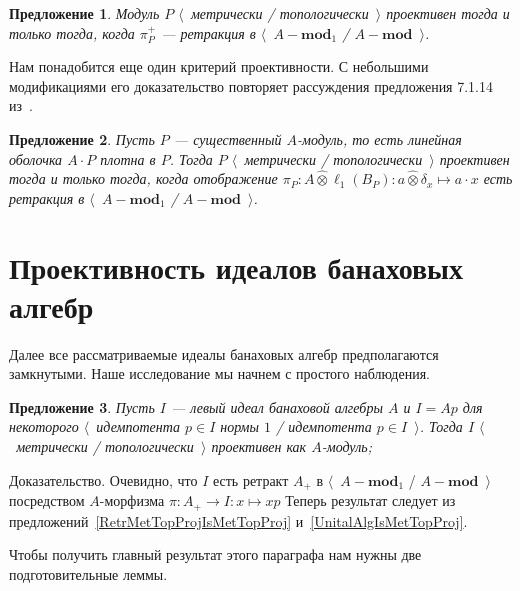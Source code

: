 \documentclass[12pt]{article}
\numberwithin{equation}{subsection}
\theoremstyle{plain}
\newtheorem{proposition}{Предложение}
\newenvironment{proof}{Доказательство.}{}
\newcommand{\projtens}{\mathbin{\widehat{\otimes}}}
\begin{document}
\begin{fulltext}
\begin{proposition}\label{MetTopProjModViaCanonicMorph} Модуль $P$
$\langle$~метрически / топологически~$\rangle$ проективен тогда и только тогда,
когда  $\pi_P^+$ --- ретракция в $\langle$~$A-\mathbf{mod}_1$ /
$A-\mathbf{mod}$~$\rangle$.
\end{proposition}

Нам понадобится еще один критерий проективности. С небольшими модификациями его
доказательство повторяет рассуждения предложения 7.1.14 
из~\cite{HelBanLocConvAlg}.

\begin{proposition}\label{NonDegenMetTopProjCharac} Пусть $P$ --- существенный
$A$-модуль, то есть линейная оболочка $A\cdot P$ плотна в $P$. Тогда $P$
$\langle$~метрически / топологически~$\rangle$ проективен тогда и только тогда,
когда отображение $\pi_P:A\projtens\ell_1(B_P):a\projtens\delta_x\mapsto a\cdot
x$ есть ретракция в $\langle$~$A-\mathbf{mod}_1$ / $A-\mathbf{mod}$~$\rangle$.
\end{proposition} 

\section{Проективность идеалов банаховых алгебр}\label{
    MetricAndTopologicalProjectivityOfIdeals
}

Далее все рассматриваемые идеалы банаховых алгебр предполагаются замкнутыми.
Наше исследование мы начнем с простого наблюдения.

\begin{proposition}\label{UnIdeallIsMetTopProj} Пусть $I$ --- левый идеал
банаховой алгебры $A$ и $I=Ap$ для некоторого $\langle$~идемпотента $p\in I$
нормы $1$ / идемпотента $p\in I$~$\rangle$. Тогда $I$ $\langle$~метрически /
топологически~$\rangle$ проективен как $A$-модуль;
\end{proposition}
\begin{proof} 
Очевидно, что $I$ есть ретракт $A_+$ в $\langle$~$A-\mathbf{mod}_1$ /
$A-\mathbf{mod}$~$\rangle$ посредством $A$-морфизма $\pi:A_+\to I:x\mapsto xp$
Теперь результат следует из предложений~\ref{RetrMetTopProjIsMetTopProj} 
и~\ref{UnitalAlgIsMetTopProj}.
\end{proof}

Чтобы получить главный результат этого параграфа нам нужны две подготовительные
леммы.


\end{fulltext}
\end{document}
